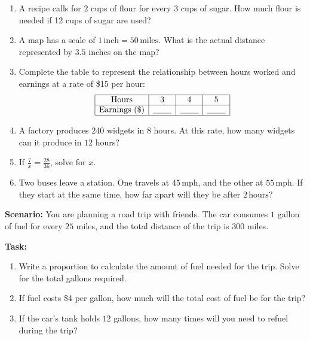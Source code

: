 \documentclass[12pt]{article}
\begin{document}
\begin{tcolorbox}[colframe=black!60, colback=white, 
coltitle=black, colbacktitle=black!15, fonttitle=\bfseries\Large, 
title=Problems, halign title=center, left=10pt, right=10pt, top=10pt, bottom=60pt]
\begin{enumerate}[start=9, itemsep=5em]
    \item A recipe calls for \( 2 \) cups of flour for every \( 3 \) cups of sugar. How much flour is needed if 12 cups of sugar are used?
    \item A map has a scale of \( 1 \, \text{inch} = 50 \, \text{miles} \). What is the actual distance represented by \( 3.5 \) inches on the map?

 \item Complete the table to represent the relationship between hours worked and earnings at a rate of \$15 per hour:
    \[
    \begin{array}{|c|c|c|c|}
    \hline
    \text{Hours} & 3 & 4 & 5 \\
    \hline
    \text{Earnings (\$)} & \_\_\_ & \_\_\_ & \_\_\_ \\
    \hline
    \end{array}
    \]
    
    \item A factory produces 240 widgets in \( 8 \) hours. At this rate, how many widgets can it produce in \( 12 \) hours?
    \item If \( \frac{7}{x} = \frac{28}{36} \), solve for \( x \).
    \item Two buses leave a station. One travels at \( 45 \, \text{mph} \), and the other at \( 55 \, \text{mph} \). If they start at the same time, how far apart will they be after \( 2 \, \text{hours} \)?
\end{enumerate}
\end{tcolorbox}

\vspace{1em}

\begin{tcolorbox}[colframe=black!60, colback=white, 
coltitle=black, colbacktitle=black!15, fonttitle=\bfseries\Large, 
title=Performance Task: Planning a Road Trip, halign title=center, left=10pt, right=10pt, top=10pt, bottom=80pt]
\textbf{Scenario:} You are planning a road trip with friends. The car consumes \( 1 \) gallon of fuel for every \( 25 \) miles, and the total distance of the trip is \( 300 \) miles.

\textbf{Task:}
\begin{enumerate}[itemsep=5em]
    \item Write a proportion to calculate the amount of fuel needed for the trip. Solve for the total gallons required.
    \item If fuel costs \$4 per gallon, how much will the total cost of fuel be for the trip?
    \item If the car’s tank holds \( 12 \) gallons, how many times will you need to refuel during the trip?
\end{enumerate}
\end{tcolorbox}
\end{document}
